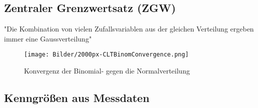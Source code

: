 \documentclass[10pt,a4paper]{article}
\begin{document}
\subsection{Zentraler Grenzwertsatz (ZGW)}

"Die Kombination von vielen Zufallsvariablen aus der gleichen Verteilung ergeben immer eine Gaussverteilung"

\begin{figure}[hbtp]
\centering
\texttt{[image: Bilder/2000px-CLTBinomConvergence.png]}
\caption{Konvergenz der Binomial- gegen die Normalverteilung}
\end{figure}

\newpage
\subsection{Kenngrößen aus Messdaten}
\end{document}
